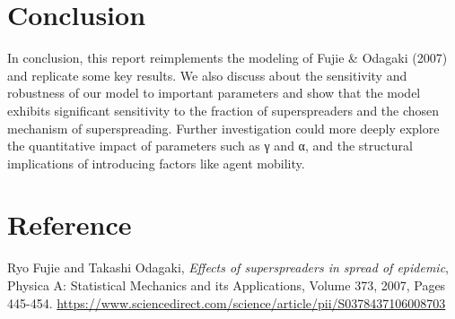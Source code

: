 \documentclass{article}
\begin{document}
\section{Conclusion}
In conclusion, this report reimplements the modeling of Fujie & Odagaki (2007) and replicate some key results. We also discuss about the sensitivity and robustness of our model to important parameters and show that the model exhibits significant sensitivity to the fraction of superspreaders and the chosen mechanism of superspreading. Further investigation could more deeply explore the quantitative impact of parameters such as γ and α, and the structural implications of introducing factors like agent mobility.
\section{Reference}
\begin{thebibliography}{9}
Ryo Fujie and Takashi Odagaki,
\textit{Effects of superspreaders in spread of epidemic},
Physica A: Statistical Mechanics and its Applications, Volume 373, 2007, Pages 445-454.
\url{https://www.sciencedirect.com/science/article/pii/S0378437106008703}
\end{thebibliography}
\end{document}

